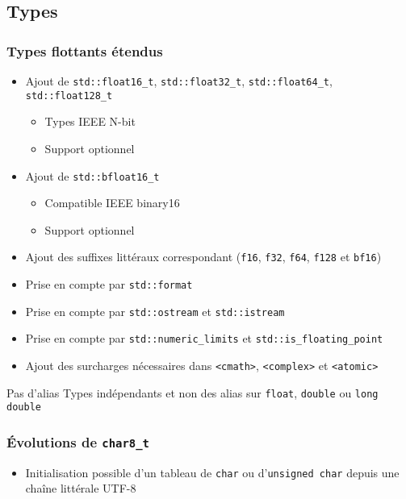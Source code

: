 \documentclass[C++.tex]{subfiles}
\begin{document}
\subsection*{Types}
\begin{frame}[fragile]
	\frametitle{Types flottants étendus}
	\begin{itemize}
		\item Ajout de \lstinline|std::float16_t|, \lstinline|std::float32_t|, \lstinline|std::float64_t|, \lstinline|std::float128_t|
		\begin{itemize}
			\item Types IEEE N-bit
			\item Support optionnel
		\end{itemize}
		\item Ajout de \lstinline|std::bfloat16_t|
		\begin{itemize}
			\item Compatible IEEE binary16
			\item Support optionnel
		\end{itemize}
		\item Ajout des suffixes littéraux correspondant (\lstinline|f16|, \lstinline|f32|, \lstinline|f64|, \lstinline|f128| et \lstinline|bf16|)
		\item Prise en compte par \lstinline|std::format|
		\item Prise en compte par \lstinline|std::ostream| et \lstinline|std::istream|
		\item Prise en compte par \lstinline|std::numeric_limits| et \lstinline|std::is_floating_point|
		\item Ajout des surcharges nécessaires dans \lstinline|<cmath>|, \lstinline|<complex>| et \lstinline|<atomic>|
	\end{itemize}

	\begin{alertblock}{Pas d'alias}
		Types indépendants et non des alias sur \lstinline|float|, \lstinline|double| ou \lstinline|long double|
	\end{alertblock}
\end{frame}

\begin{frame}[fragile]
	\frametitle{Évolutions de \lstinline|char8_t|}
	\begin{itemize}
		\item Initialisation possible d'un tableau de \lstinline|char| ou d'\lstinline|unsigned char| depuis une chaîne littérale UTF-8
	\end{itemize}
\end{frame}
\end{document}
